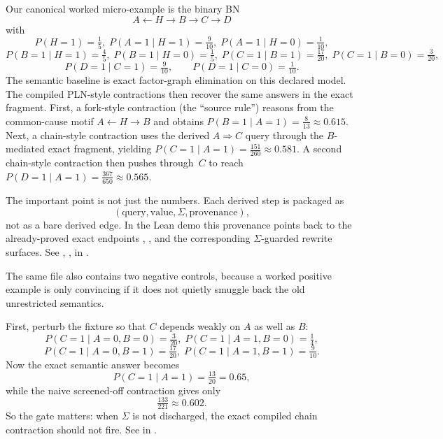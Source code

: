 \documentclass[11pt,openany]{report}
\begin{document}
Our canonical worked micro-example is the binary BN
\[
  A \leftarrow H \to B \to C \to D
\]
with
\[
  P(H{=}1)=\tfrac15,\;
  P(A{=}1 \mid H{=}1)=\tfrac9{10},\;
  P(A{=}1 \mid H{=}0)=\tfrac1{10},
\]
\[
  P(B{=}1 \mid H{=}1)=\tfrac45,\;
  P(B{=}1 \mid H{=}0)=\tfrac15,\;
  P(C{=}1 \mid B{=}1)=\tfrac{17}{20},\;
  P(C{=}1 \mid B{=}0)=\tfrac3{20},
\]
\[
  P(D{=}1 \mid C{=}1)=\tfrac9{10},\qquad
  P(D{=}1 \mid C{=}0)=\tfrac1{10}.
\]
The semantic baseline is exact factor-graph elimination on this declared
model.  The compiled PLN-style contractions then recover the same answers
in the exact fragment.  First, a fork-style contraction (the ``source
rule'') reasons from the common-cause motif $A \leftarrow H \to B$ and
obtains $P(B{=}1 \mid A{=}1)=\tfrac8{13}\approx 0.615$.  Next, a
chain-style contraction uses the derived $A \Rightarrow C$ query through
the $B$-mediated exact fragment, yielding
$P(C{=}1 \mid A{=}1)=\tfrac{151}{260}\approx 0.581$.  A second
chain-style contraction then pushes through~$C$ to reach
$P(D{=}1 \mid A{=}1)=\tfrac{367}{650}\approx 0.565$.

The important point is not just the numbers.  Each derived step is
packaged as
\[
  (\text{query}, \text{value}, \Sigma, \text{provenance}),
\]
not as a bare derived edge.  In the Lean demo this provenance points back
to the already-proved exact endpoints
,
, and the corresponding
$\Sigma$-guarded rewrite surfaces.  See
,
,
 in
.

The same file also contains two negative controls, because a worked
positive example is only convincing if it does not quietly smuggle back
the old unrestricted semantics.

First, perturb the fixture so that $C$ depends weakly on $A$ as well as
$B$:
\[
  P(C{=}1 \mid A{=}0,B{=}0)=\tfrac3{20},\;
  P(C{=}1 \mid A{=}1,B{=}0)=\tfrac14,
\]
\[
  P(C{=}1 \mid A{=}0,B{=}1)=\tfrac{17}{20},\;
  P(C{=}1 \mid A{=}1,B{=}1)=\tfrac9{10}.
\]
Now the exact semantic answer becomes
\[
  P(C{=}1 \mid A{=}1)=\tfrac{13}{20}=0.65,
\]
while the naive screened-off contraction gives only
\[
  \tfrac{133}{221}\approx 0.602.
\]
So the gate matters: when $\Sigma$ is not discharged, the exact compiled
chain contraction should not fire.  See
 in
.
\end{document}
